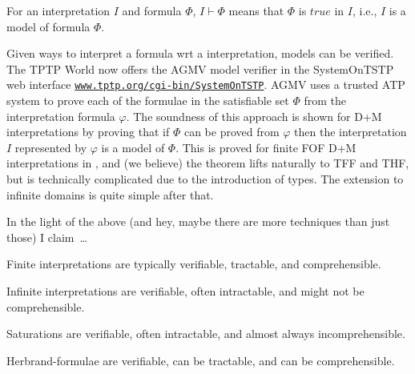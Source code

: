\documentclass{easychair}
\newenvironment{packed_itemize}{
\vspace*{-0.2em}
\begin{itemize}
\setlength{\partopsep}{0pt}
\setlength{\itemsep}{1pt}
\setlength{\parskip}{0pt}
\setlength{\parsep}{0pt}
}{\end{itemize}}
\begin{document}
For an interpretation $I$ and formula $\Phi$, $I \vdash \Phi$ means that $\Phi$ is $true$ in $I$, 
i.e., $I$ is a model of formula $\Phi$.

Given ways to interpret a formula wrt a interpretation, models can be verified.
The TPTP World now offers the AGMV model verifier in the SystemOnTSTP \cite{Sut07-CSR} web 
interface \href{https://www.tptp.org/cgi-bin/SystemOnTSTP}{{\tt www.tptp.org/cgi-bin/SystemOnTSTP}}.
AGMV uses a trusted ATP system to prove each of the formulae in the satisfiable set $\Phi$
from the interpretation formula $\varphi$.
The soundness of this approach is shown for {\sf D+M} interpretations by proving that if 
$\Phi$ can be proved from $\varphi$ then the interpretation $I$ represented by $\varphi$ is 
a model of $\Phi$.
This is proved for finite FOF {\sf D+M} interpretations in \cite{SS+23-LPAR}, and (we believe) 
the theorem lifts naturally to TFF and THF, but is technically complicated due to the introduction 
of types.
The extension to infinite domains is quite simple after that.

In the light of the above (and hey, maybe there are more techniques than just those) I claim~\ldots
\begin{packed_itemize}
\item Finite interpretations are typically verifiable, tractable, and comprehensible.
\item Infinite interpretations are verifiable, often intractable, and might not be 
      comprehensible.
\item Saturations are verifiable, often intractable, and almost always incomprehensible.
\item Herbrand-formulae are verifiable, can be tractable, and can be comprehensible.
\end{packed_itemize}
\end{document}
